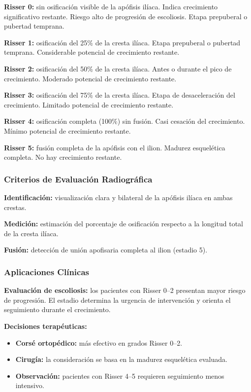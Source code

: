 	\textbf{Risser 0:} sin osificación visible de la apófisis ilíaca. Indica crecimiento
	significativo restante. Riesgo alto de progresión de escoliosis. Etapa prepuberal o
	pubertad temprana.
	
	\textbf{Risser 1:} osificación del 25\% de la cresta ilíaca. Etapa prepuberal o
	pubertad temprana. Considerable potencial de crecimiento restante.
	
	\textbf{Risser 2:} osificación del 50\% de la cresta ilíaca. Antes o durante el pico
	de crecimiento. Moderado potencial de crecimiento restante.
	
	\textbf{Risser 3:} osificación del 75\% de la cresta ilíaca. Etapa de desaceleración
	del crecimiento. Limitado potencial de crecimiento restante.
	
	\textbf{Risser 4:} osificación completa (100\%) sin fusión. Casi cesación del
	crecimiento. Mínimo potencial de crecimiento restante.
	
	\textbf{Risser 5:} fusión completa de la apófisis con el ilion. Madurez esquelética
	completa. No hay crecimiento restante.
	
	\subsubsection*{Criterios de Evaluación Radiográfica}
	
	\textbf{Identificación:} visualización clara y bilateral de la apófisis ilíaca en
	ambas crestas.
	
	\textbf{Medición:} estimación del porcentaje de osificación respecto a la longitud
	total de la cresta ilíaca.
	
	\textbf{Fusión:} detección de unión apofisaria completa al ilion (estadio 5).
	
	\subsubsection*{Aplicaciones Clínicas}
	
	\textbf{Evaluación de escoliosis:} los pacientes con Risser 0--2 presentan mayor riesgo
	de progresión. El estadio determina la urgencia de intervención y orienta el
	seguimiento durante el crecimiento.
	
	\textbf{Decisiones terapéuticas:}
	\begin{itemize}
		\item \textbf{Corsé ortopédico:} más efectivo en grados Risser 0--2.
		\item \textbf{Cirugía:} la consideración se basa en la madurez esquelética evaluada.
		\item \textbf{Observación:} pacientes con Risser 4--5 requieren seguimiento menos
		intensivo.
	\end{itemize}
	
